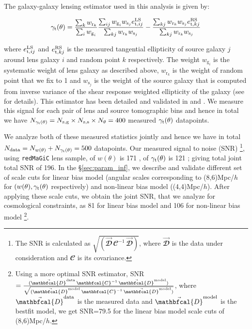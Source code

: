 \documentclass[aps, prd,twocolumn,superscriptaddress,nofootinbib,preprintnumbers]{revtex4-1}
\newcommand{\gammat}{\ensuremath{\gamma_{\rm t}(\theta)}}
\newcommand{\wtheta}{\ensuremath{w(\theta)}}
\newcommand{\redmagic}{\texttt{redMaGiC} }
\begin{document}
The galaxy-galaxy lensing estimator used in this analysis is given by:
\begin{linenomath*}
\begin{equation}
    \gamma_{\rm t}(\theta) = \frac{\sum_k w_{\textrm{r}_k}}{\sum_i w_{\textrm{g}_i}} \frac{\sum_{ij} w_{\textrm{g}_i} w_{\textrm{s}_j} e^{\rm LS}_{{\rm t},ij}}{\sum_{kj} w_{\textrm{r}_k} w_{\textrm{s}_j}} - \frac{\sum_{kj} w_{\textrm{r}_k} w_{\textrm{s}_j} e^{\rm RS}_{{\rm t},kj}}{\sum_{kj} w_{\textrm{r}_k} w_{\textrm{s}_j}}
\end{equation}
\end{linenomath*}
where $e^{\rm LS}_{{\rm t},ij}$ and $e^{\rm RS}_{{\rm t},kj}$ is the measured tangential ellipticity of source galaxy $j$ around lens galaxy $i$ and random point $k$ respectively. The weight $w_{\textrm{g}_i}$ is the systematic weight of lens galaxy as described above, $w_{\textrm{r}_k}$ is the weight of random point that we fix to 1 and $w_{\textrm{s}_j}$ is the weight of the source galaxy that is computed from inverse variance of the shear response weighted ellipticity of the galaxy (see \citet*{y3-shapecatalog} for details). 
This estimator has been detailed and validated in \citet{Singh_2017} and \citet*{y3-gglensing}. We measure this signal for each pair of lens and source tomographic bins and hence in total we have  $N_{\gammat} = N_{\rm z,g} \times N_{\rm z,s} \times N_{\theta} = 400$ measured $\gammat$ datapoints. 

We analyze both of these measured statistics jointly and hence we have in total $N_{\rm data} = N_{\wtheta} + N_{\gammat} = 500$ datapoints. Our measured signal to noise (SNR) \footnote{The SNR is calculated as $\sqrt{(\vec{\mathbfcal{D}}\, {\mathbfcal{C}}^{-1}\,  \vec{\mathbfcal{D}})}$, where $\vec{\mathbfcal{D}}$ is the data under consideration and $\mathbfcal{C}$ is its covariance.}, using \redmagic lens sample, of $\wtheta$ is 171 \citep{y3-galaxyclustering}, of  $\gammat$ is 121 \citep{y3-gglensing}; giving total joint total SNR of 196. In the \S\ref{sec:param_inf}, we describe and validate different set of scale cuts for linear bias model (angular scales corresponding to (8,6)Mpc/$h$ for $(w(\theta),\gamma_{\rm t}(\theta)$ respectively) and non-linear bias model ((4,4)Mpc/$h$). After applying these scale cuts, we obtain the joint SNR, that we analyze for cosmological constraints, as 81 for linear bias model and 106 for non-linear bias model \footnote{Using a more optimal SNR estimator, SNR$= \frac{(\vec{\mathbfcal{D}}^{\rm data}\, {\mathbfcal{C}}^{-1}\,  \vec{\mathbfcal{D}}^{\rm model})}{\sqrt{(\vec{\mathbfcal{D}}^{\rm model}\, {\mathbfcal{C}}^{-1}\,  \vec{\mathbfcal{D}}^{\rm model})}}$, where $\vec{\mathbfcal{D}}^{\rm data}$ is the measured data and $\vec{\mathbfcal{D}}^{\rm model}$ is the bestfit model, we get SNR=79.5 for the linear bias model scale cuts of (8,6)Mpc/$h$.}. 
\end{document}
